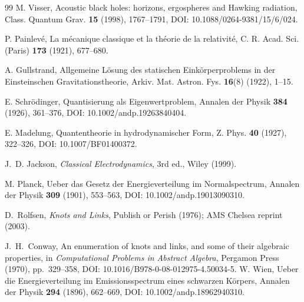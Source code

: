 \documentclass[11pt]{article}
\theoremstyle{definition}
\theoremstyle{plain}
\theoremstyle{remark}
\begin{document}
\begin{thebibliography}{99}
            M. Visser,
            \newblock Acoustic black holes: horizons, ergospheres and Hawking radiation,
            \newblock Class. Quantum Grav. \textbf{15} (1998), 1767--1791,
            \newblock DOI: 10.1088/0264-9381/15/6/024.

            P. Painlev\'e,
            \newblock La m\'ecanique classique et la th\'eorie de la relativit\'e,
            \newblock C. R. Acad. Sci. (Paris) \textbf{173} (1921), 677--680.

            A. Gullstrand,
            \newblock Allgemeine L\"osung des statischen Eink\"orperproblems in der Einsteinschen Gravitationstheorie,
            \newblock Arkiv. Mat. Astron. Fys. \textbf{16}(8) (1922), 1--15.

            E. Schr\"odinger,
            \newblock Quantisierung als Eigenwertproblem,
            \newblock Annalen der Physik \textbf{384} (1926), 361--376,
            \newblock DOI: 10.1002/andp.19263840404.

            E. Madelung,
            \newblock Quantentheorie in hydrodynamischer Form,
            \newblock Z. Phys. \textbf{40} (1927), 322--326,
            \newblock DOI: 10.1007/BF01400372.

            J.~D. Jackson,
            \newblock \emph{Classical Electrodynamics}, 3rd ed.,
            \newblock Wiley (1999).

            M. Planck,
            \newblock Ueber das Gesetz der Energieverteilung im Normalspectrum,
            \newblock Annalen der Physik \textbf{309} (1901), 553--563,
            \newblock DOI: 10.1002/andp.19013090310.


            D.~Rolfsen,
            \newblock \emph{Knots and Links},
            \newblock Publish or Perish (1976); AMS Chelsea reprint (2003).

            J.~H.~Conway,
            \newblock An enumeration of knots and links, and some of their algebraic properties,
            \newblock in \emph{Computational Problems in Abstract Algebra}, Pergamon Press (1970), pp.~329--358,
            \newblock DOI: 10.1016/B978-0-08-012975-4.50034-5.
            W. Wien,
            \newblock Ueber die Energieverteilung im Emissionsspectrum eines schwarzen K\"orpers,
            \newblock Annalen der Physik \textbf{294} (1896), 662--669,
            \newblock DOI: 10.1002/andp.18962940310.


\end{thebibliography}
\end{document}
